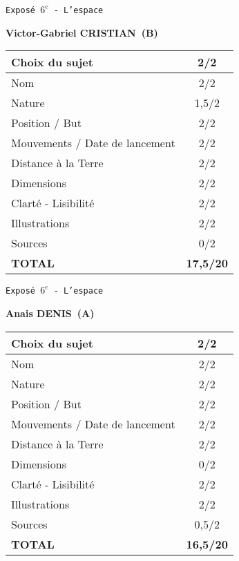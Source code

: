 	\vspace*{1cm}
	
	\newpage
	\LARGE{\texttt{Expos\'e $6^e$ - L'espace}}
	\vspace*{1cm}

	\textbf{Victor-Gabriel CRISTIAN\ (B)}

	\vspace*{1.5cm}
	\begin{tabular}{|l|c|}
		\hline
		Choix du sujet & 2/2 \\
		\hline
		Nom & 2/2 \\
		\hline
		Nature & 1,5/2 \\
		\hline
		Position / But & 2/2 \\
		\hline
		Mouvements / Date de lancement & 2/2 \\
		\hline
		Distance \`a la Terre & 2/2 \\
		\hline
		Dimensions & 2/2 \\
		\hline
		Clart\'e - Lisibilit\'e & 2/2 \\
		\hline
		Illustrations & 2/2 \\
		\hline
		Sources & 0/2 \\
		\hline
		\textbf{TOTAL}  & \textbf{17,5/20} \\
		\hline
	\end{tabular}

	\vspace*{1cm}
	
	\newpage
	\LARGE{\texttt{Expos\'e $6^e$ - L'espace}}
	\vspace*{1cm}

	\textbf{Anais DENIS\ (A)}

	\vspace*{1.5cm}
	\begin{tabular}{|l|c|}
		\hline
		Choix du sujet & 2/2 \\
		\hline
		Nom & 2/2 \\
		\hline
		Nature & 2/2 \\
		\hline
		Position / But & 2/2 \\
		\hline
		Mouvements / Date de lancement & 2/2 \\
		\hline
		Distance \`a la Terre & 2/2 \\
		\hline
		Dimensions & 0/2 \\
		\hline
		Clart\'e - Lisibilit\'e & 2/2 \\
		\hline
		Illustrations & 2/2 \\
		\hline
		Sources & 0,5/2 \\
		\hline
		\textbf{TOTAL}  & \textbf{16,5/20} \\
		\hline
	\end{tabular}

